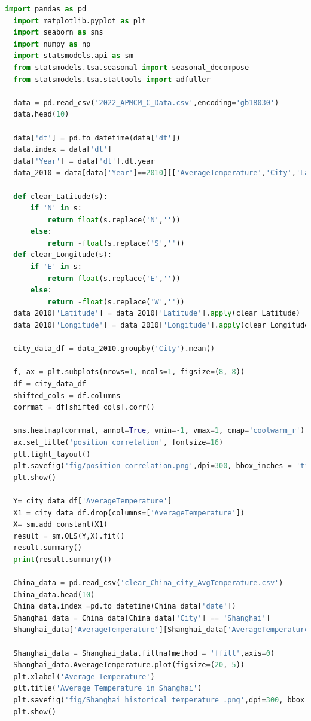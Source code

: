 \documentclass{apmcmthesis}
\begin{document}
  \newpage
  \begin{lstlisting}[language=python, caption={The python source code of multiple analysis}]
  import pandas as pd
  import matplotlib.pyplot as plt
  import seaborn as sns
  import numpy as np
  import statsmodels.api as sm
  from statsmodels.tsa.seasonal import seasonal_decompose
  from statsmodels.tsa.stattools import adfuller
  
  data = pd.read_csv('2022_APMCM_C_Data.csv',encoding='gb18030')
  data.head(10)
  
  data['dt'] = pd.to_datetime(data['dt'])
  data.index = data['dt']
  data['Year'] = data['dt'].dt.year
  data_2010 = data[data['Year']==2010][['AverageTemperature','City','Latitude','Longitude']]
  
  def clear_Latitude(s):
      if 'N' in s:
          return float(s.replace('N',''))
      else:
          return -float(s.replace('S',''))
  def clear_Longitude(s):
      if 'E' in s:
          return float(s.replace('E',''))
      else:
          return -float(s.replace('W',''))
  data_2010['Latitude'] = data_2010['Latitude'].apply(clear_Latitude)
  data_2010['Longitude'] = data_2010['Longitude'].apply(clear_Longitude)
  
  city_data_df = data_2010.groupby('City').mean()
  
  f, ax = plt.subplots(nrows=1, ncols=1, figsize=(8, 8))
  df = city_data_df
  shifted_cols = df.columns
  corrmat = df[shifted_cols].corr()
  
  sns.heatmap(corrmat, annot=True, vmin=-1, vmax=1, cmap='coolwarm_r')
  ax.set_title('position correlation', fontsize=16)
  plt.tight_layout()
  plt.savefig('fig/position correlation.png',dpi=300, bbox_inches = 'tight')
  plt.show()
  
  Y= city_data_df['AverageTemperature']
  X1 = city_data_df.drop(columns=['AverageTemperature'])
  X= sm.add_constant(X1)
  result = sm.OLS(Y,X).fit()
  result.summary()
  print(result.summary())
  
  China_data = pd.read_csv('clear_China_city_AvgTemperature.csv')
  China_data.head(10)
  China_data.index =pd.to_datetime(China_data['date'])
  Shanghai_data = China_data[China_data['City'] == 'Shanghai']
  Shanghai_data['AverageTemperature'][Shanghai_data['AverageTemperature']<-18]=np.nan
  
  Shanghai_data = Shanghai_data.fillna(method = 'ffill',axis=0)
  Shanghai_data.AverageTemperature.plot(figsize=(20, 5))
  plt.xlabel('Average Temperature')
  plt.title('Average Temperature in Shanghai')
  plt.savefig('fig/Shanghai historical temperature .png',dpi=300, bbox_inches = 'tight')
  plt.show()
  

\end{lstlisting}
\end{document}
